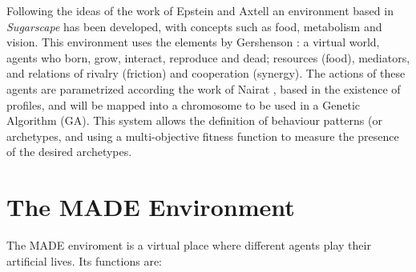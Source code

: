 \documentclass[runningheads]{llncs}
\begin{document}
Following the ideas of the work of Epstein and Axtell
\cite{epstein1996growing} an environment based in {\em Sugarscape} has
been developed, with concepts such as food, metabolism and
vision. This environment uses the elements  by Gershenson %
\cite{gershenson2005general}: a virtual world, agents who born, grow,
interact, reproduce and dead; resources (food), mediators, and
relations of rivalry (friction) and cooperation (synergy). The actions
of these agents are parametrized according the work of Nairat
\cite{nairat2011character}, based in the existence of profiles, and
will be mapped into a chromosome to be used in a Genetic Algorithm
(GA). This system allows the definition of behaviour patterns (or
archetypes, and using a multi-objective fitness function to measure
the presence of the desired archetypes. %



\section{The MADE Environment}
\label{sec:made}

The MADE enviroment is a virtual place where different agents play their artificial lives. Its functions are:
\end{document}
